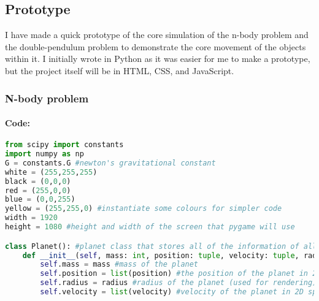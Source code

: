 \documentclass[12pt]{article}
\begin{document}
\newpage
\subsection{Prototype}
I have made a quick prototype of the core simulation of the n-body problem and the double-pendulum problem to demonstrate the core movement of the objects within it. I initially wrote in Python as it was easier for me to make a prototype, but the project itself will be in HTML, CSS, and JavaScript.
\subsubsection{N-body problem}
\paragraph{Code:}
\begin{lstlisting}[language=Python]
from scipy import constants
import numpy as np
G = constants.G #newton's gravitational constant
white = (255,255,255)
black = (0,0,0)
red = (255,0,0)
blue = (0,0,255)
yellow = (255,255,0) #instantiate some colours for simpler code
width = 1920
height = 1080 #height and width of the screen that pygame will use

class Planet(): #planet class that stores all of the information of all the planets
    def __init__(self, mass: int, position: tuple, velocity: tuple, radius):
        self.mass = mass #mass of the planet
        self.position = list(position) #the position of the planet in 2D space stored as a list
        self.radius = radius #radius of the planet (used for rendering)
        self.velocity = list(velocity) #velocity of the planet in 2D space stored as component speeds in each dimension


\end{lstlisting}
\end{document}

